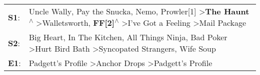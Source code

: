 \begin{supertabular}{p{0.03\textwidth}p{0.92\textwidth}}
 \textbf{S1}:  &  Uncle Wally\textsuperscript{}, \enspace Pay the Snucka\textsuperscript{}, \enspace Nemo\textsuperscript{}, \enspace Prowler[1]\textsuperscript{} \textgreater \enspace \textbf{The Haunt\textsuperscript{$\wedge$}} \textgreater \enspace Walletsworth\textsuperscript{}, \enspace \textbf{FF[2]\textsuperscript{$\wedge$}} \textgreater \enspace I've Got a Feeling\textsuperscript{} \textgreater \enspace Mail Package\textsuperscript{}  \enspace  \\
 \textbf{S2}:  &                                                                                                                          Big Heart\textsuperscript{}, \enspace In The Kitchen\textsuperscript{}, \enspace All Things Ninja\textsuperscript{}, \enspace Bad Poker\textsuperscript{} \textgreater \enspace Hurt Bird Bath\textsuperscript{} \textgreater \enspace Syncopated Strangers\textsuperscript{}, \enspace Wife Soup\textsuperscript{}  \enspace  \\
 \textbf{E1}:  &                                                                                                                                                                                                                                                                                           Padgett's Profile\textsuperscript{} \textgreater \enspace Anchor Drops\textsuperscript{} \textgreater \enspace Padgett's Profile\textsuperscript{}  \enspace  \\
\end{supertabular}

